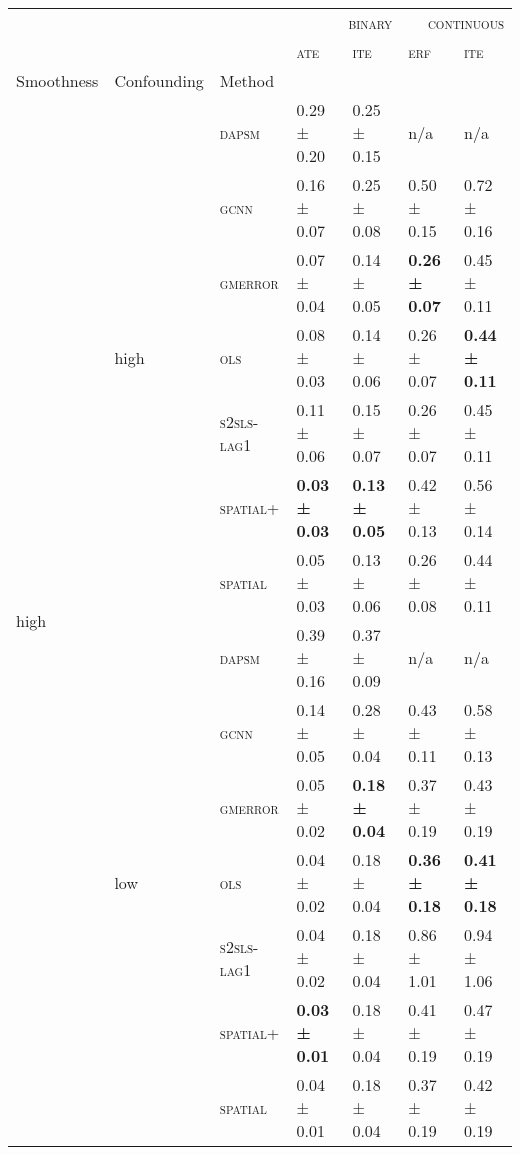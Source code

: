 \documentclass{article}
\begin{document}
\scriptsize
\begin{table}[!tbp]
\centering
\begin{tabular}{lllllll}
\toprule
 &  &  & \multicolumn{2}{r}{\textsc{binary}} & \multicolumn{2}{r}{\textsc{continuous}} \\
 &  &  & \textsc{ate} & \textsc{ite} & \textsc{erf} & \textsc{ite} \\
Smoothness & Confounding & Method &  &  &  &  \\
\midrule
\multirow[t]{14}{*}{high} & \multirow[t]{7}{*}{high} & \textsc{dapsm} & 0.29 ± {\small 0.20} & 0.25 ± {\small 0.15} & n/a & n/a \\
 &  & \textsc{gcnn} & 0.16 ± {\small 0.07} & 0.25 ± {\small 0.08} & 0.50 ± {\small 0.15} & 0.72 ± {\small 0.16} \\
 &  & \textsc{gmerror} & 0.07 ± {\small 0.04} & 0.14 ± {\small 0.05} & \bf 0.26 ± {\small 0.07} & 0.45 ± {\small 0.11} \\
 &  & \textsc{ols} & 0.08 ± {\small 0.03} & 0.14 ± {\small 0.06} & 0.26 ± {\small 0.07} & \bf 0.44 ± {\small 0.11} \\
 &  & \textsc{s2sls-lag1} & 0.11 ± {\small 0.06} & 0.15 ± {\small 0.07} & 0.26 ± {\small 0.07} & 0.45 ± {\small 0.11} \\
 &  & \textsc{spatial+} & \bf 0.03 ± {\small 0.03} & \bf 0.13 ± {\small 0.05} & 0.42 ± {\small 0.13} & 0.56 ± {\small 0.14} \\
 &  & \textsc{spatial} & 0.05 ± {\small 0.03} & 0.13 ± {\small 0.06} & 0.26 ± {\small 0.08} & 0.44 ± {\small 0.11} \\
\cline{2-7}
 & \multirow[t]{7}{*}{low} & \textsc{dapsm} & 0.39 ± {\small 0.16} & 0.37 ± {\small 0.09} & n/a & n/a \\
 &  & \textsc{gcnn} & 0.14 ± {\small 0.05} & 0.28 ± {\small 0.04} & 0.43 ± {\small 0.11} & 0.58 ± {\small 0.13} \\
 &  & \textsc{gmerror} & 0.05 ± {\small 0.02} & \bf 0.18 ± {\small 0.04} & 0.37 ± {\small 0.19} & 0.43 ± {\small 0.19} \\
 &  & \textsc{ols} & 0.04 ± {\small 0.02} & 0.18 ± {\small 0.04} & \bf 0.36 ± {\small 0.18} & \bf 0.41 ± {\small 0.18} \\
 &  & \textsc{s2sls-lag1} & 0.04 ± {\small 0.02} & 0.18 ± {\small 0.04} & 0.86 ± {\small 1.01} & 0.94 ± {\small 1.06} \\
 &  & \textsc{spatial+} & \bf 0.03 ± {\small 0.01} & 0.18 ± {\small 0.04} & 0.41 ± {\small 0.19} & 0.47 ± {\small 0.19} \\
 &  & \textsc{spatial} & 0.04 ± {\small 0.01} & 0.18 ± {\small 0.04} & 0.37 ± {\small 0.19} & 0.42 ± {\small 0.19} \\

\end{tabular}
\end{table}
\end{document}
